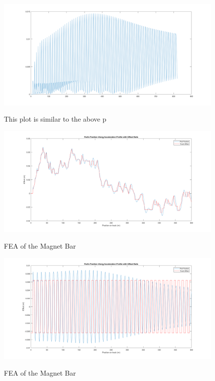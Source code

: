 \documentclass[main.tex]{subfiles}
\begin{document}
    \begin{figure}
        	\centering
        \includegraphics[width=\linewidth]{images/OscillatingMaxDistToRail}
        \label{fig:OMaxDistRail}
        \caption{This plot is similar to the above p}
    \end{figure}
    
    
    \begin{figure}
    	\centering
        \includegraphics[width=\linewidth]{images/RandPodLateralResponse}
        \label{fig:RandpodLateralResponse}
        \caption{FEA of the Magnet Bar}
    \end{figure}
    \begin{figure}
    	\centering
        \includegraphics[width=\linewidth]{images/OscillatingPodLateralResponse}
        \label{fig:OPodLateralRespnse}
        \caption{FEA of the Magnet Bar}
    \end{figure}    
\end{document}
